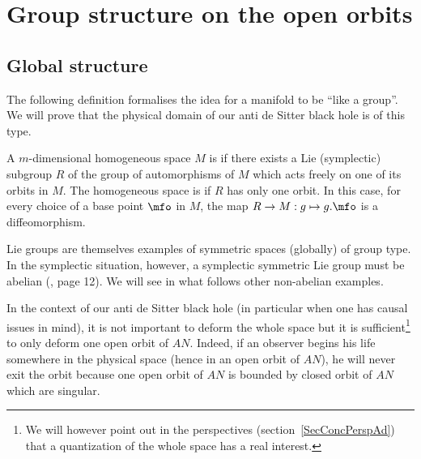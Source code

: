 \section{Group structure on the open orbits}
\label{SecGpStructOuvertOrb}

 \subsection{Global structure}

The following definition formalises the idea for a manifold to be ``like a group''. We will prove that the physical domain of our anti de Sitter black hole is of this type.
\begin{definition}
A $m$-dimensional homogeneous space $M$ is  if there exists a Lie (symplectic) subgroup $R$ of the group of automorphisms of $M$ which acts freely on one of its orbits in $M$. The homogeneous space is  if $R$ has only one orbit. In this case, for every choice of a base point $\mfo$ in $M$, the map $R\to M:g\mapsto g.\mfo$ is a diffeomorphism.
            \label{DefGlobGpType}
\end{definition}

Lie groups are themselves examples of symmetric spaces (globally) of group type.  In the symplectic situation, however, a symplectic symmetric Lie group must be abelian (\cite{ThzPierre}, page 12). We will see in what follows other non-abelian examples.

In the context of our anti de Sitter black hole (in particular when one has causal issues in mind), it is not important to deform the whole space but it is sufficient\footnote{We will however point out in the perspectives (section~\ref{SecConcPerspAd}) that a quantization of the whole space has a real interest.} to only deform one open orbit of $AN$. Indeed, if an observer begins his life somewhere in the physical space (hence in an open orbit of $AN$), he will never exit the orbit because one open orbit of $AN$ is bounded by closed orbit of $AN$ which are singular.

